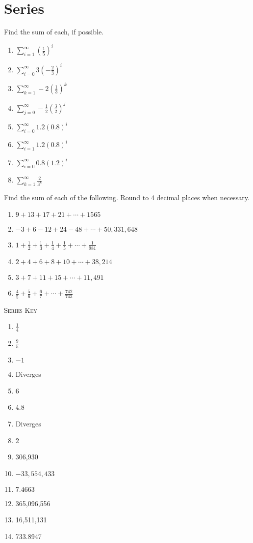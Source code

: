 \chapter{Series}

Find the sum of each, if possible.

\begin{enumerate}
    \item $\sum_{i=1}^{\infty} \left(\frac{1}{5}\right)^i$
    \item $\sum_{i=0}^{\infty} 3\left(-\frac{2}{3}\right)^i$
    \item $\sum_{k=1}^{\infty} -2\left(\frac{1}{3}\right)^k$
    \item $\sum_{j=0}^{\infty} -\frac{1}{2}\left(\frac{3}{2}\right)^j$
    \item $\sum_{i=0}^{\infty} 1.2(0.8)^i$
	\item $\sum_{i=1}^{\infty} 1.2(0.8)^i$
	\item $\sum_{i=0}^{\infty} 0.8(1.2)^i$
	\item $\sum_{k=1}^{\infty} \frac{2}{3^k}$
\setcounter{Review}{\value{enumi}}
\end{enumerate}

Find the sum of each of the following. Round to 4 decimal places when necessary.
\begin{enumerate}   \setcounter{enumi}{\value{Review}}
    \item $9 + 13 + 17 + 21 + \cdots + 1565$
    \item $-3 + 6 - 12 + 24 - 48 + \cdots + 50,331,648$
    \item $1 + \frac{1}{2} + \frac{1}{3} + \frac{1}{4} + \frac{1}{5} + \cdots + \frac{1}{981}$
    \item $2 + 4 + 6 + 8 + 10 + \cdots + 38,214$
    \item $3 + 7 + 11 + 15 + \cdots + 11,491$
	\item $\frac{4}{5} + \frac{5}{6} + \frac{6}{7} + \cdots + \frac{742}{743}$
\end{enumerate}	\setcounter{Review}{\value{enumi}}

\newpage

\textsc{Series Key}

\begin{enumerate}
	\item $\frac{1}{4}$
    \item $\frac{9}{5}$
    \item $-1$
    \item Diverges
    \item 6
	\item 4.8
	\item Diverges
	\item 2
    \item 306,930
    \item $-33,554,433$
    \item $7.4663$
    \item 365,096,556
    \item 16,511,131
	\item 733.8947
\end{enumerate}
